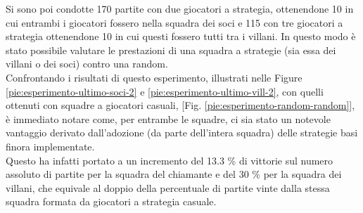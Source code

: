 Si sono poi condotte 170 partite con due giocatori a strategia, ottenendone 10 in cui entrambi i giocatori fossero nella squadra dei soci e 115 con tre giocatori a strategia ottenendone 10 in cui questi fossero tutti tra i villani.
In questo modo è stato possibile valutare le prestazioni di una squadra a strategie (sia essa dei villani o dei soci) contro una random.\\
Confrontando i risultati di questo esperimento, illustrati nelle Figure \ref{pie:esperimento-ultimo-soci-2} e \ref{pie:esperimento-ultimo-vill-2}, con quelli ottenuti con squadre a giocatori casuali, [Fig. \ref{pie:esperimento-random-random}], è immediato notare come, per entrambe le squadre, ci sia stato un notevole vantaggio derivato dall'adozione (da parte dell'intera squadra) delle strategie basi finora implementate.
\\Questo ha infatti portato a un incremento del 13.3 \% di vittorie sul numero assoluto di partite per la squadra del chiamante e del 30 \% per la squadra dei villani, che equivale al doppio della percentuale di partite vinte dalla stessa squadra formata da giocatori a strategia casuale.









